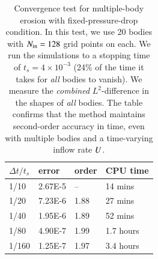 \documentclass[preprint, 10pt]{elsarticle}
\begin{document}
\begin{table}%
\begin{center}
\caption{Convergence test for multiple-body erosion with fixed-pressure-drop condition. In this test, we use 20 bodies with $N_{\mathrm{in}} = 128$ grid points on each. We run the simulations to a stopping time of $t_s = 4 \times 10^{-3}$ (24\% of the time it takes for {\em all} bodies to vanish). We measure the {\em combined} $L^2$-difference in the shapes of {\em all} bodies. The table confirms that the method maintains second-order accuracy in time, even with multiple bodies and a time-varying inflow rate $U$.
}
\vspace{0.3 pc}
\label{convtab2}
\begin{tabular}{l l l l}
\hline
\hspace{0.0pc} $\Delta t/t_s$
\hspace{0.5pc} & error 
\hspace{0.5pc} & order
\hspace{0.5pc} & CPU time \\
\hline
%
1/10     	& 2.67E-5  	& --        	& 14 mins  	\\
1/20     	& 7.23E-6  	& 1.88 	& 27 mins  	\\
1/40     	& 1.95E-6  	& 1.89 	& 52 mins  	\\
1/80     	& 4.90E-7  	& 1.99 	& 1.7 hours	\\
1/160     	& 1.25E-7  	& 1.97  	& 3.4 hours	\\
%
\hline
\end{tabular}
\end{center}
\end{table}
\end{document}
